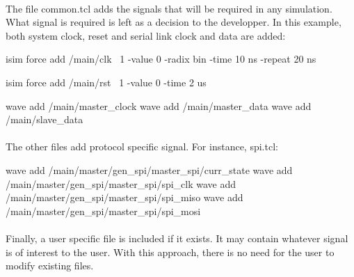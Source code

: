 \documentclass[12pt]{article}
\begin{document}
\paragraph{}
The file common.tcl adds the signals that will be required in any simulation.
What signal is required is left as a decision to the developper. In this
example, both system clock, reset and serial link clock and data are added:
\begin{tcl}
isim force add {/main/clk} \
 1 -value 0 -radix bin -time 10 ns -repeat 20 ns

isim force add {/main/rst} \
 1 -value 0 -time 2 us

wave add /main/master_clock
wave add /main/master_data
wave add /main/slave_data
\end{tcl}

\paragraph{}
The other files add protocol specific signal. For instance, spi.tcl:
\begin{tcl}
wave add /main/master/gen_spi/master_spi/curr_state
wave add /main/master/gen_spi/master_spi/spi_clk
wave add /main/master/gen_spi/master_spi/spi_miso
wave add /main/master/gen_spi/master_spi/spi_mosi
\end{tcl}

\paragraph{}
Finally, a user specific file is included if it exists. It may contain
whatever signal is of interest to the user. With this approach, there
is no need for the user to modify existing files.


\end{document}
